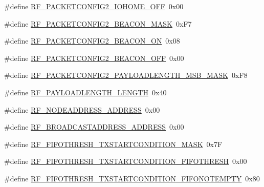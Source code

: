 \begin{DoxyCompactItemize}
\item 
\#define \mbox{\hyperlink{sx1276_regs-_fsk_8h_a4c835d63f6e0105443e2ce5353f9f7fb}{R\+F\+\_\+\+P\+A\+C\+K\+E\+T\+C\+O\+N\+F\+I\+G2\+\_\+\+I\+O\+H\+O\+M\+E\+\_\+\+O\+FF}}~0x00
\item 
\#define \mbox{\hyperlink{sx1276_regs-_fsk_8h_a1c363971f1c7a8065204bc8c6f156333}{R\+F\+\_\+\+P\+A\+C\+K\+E\+T\+C\+O\+N\+F\+I\+G2\+\_\+\+B\+E\+A\+C\+O\+N\+\_\+\+M\+A\+SK}}~0x\+F7
\item 
\#define \mbox{\hyperlink{sx1276_regs-_fsk_8h_a454732572980957a184bc0ad1b0248e4}{R\+F\+\_\+\+P\+A\+C\+K\+E\+T\+C\+O\+N\+F\+I\+G2\+\_\+\+B\+E\+A\+C\+O\+N\+\_\+\+ON}}~0x08
\item 
\#define \mbox{\hyperlink{sx1276_regs-_fsk_8h_a06a6c1e69dfcb07cc709d00d5935e43d}{R\+F\+\_\+\+P\+A\+C\+K\+E\+T\+C\+O\+N\+F\+I\+G2\+\_\+\+B\+E\+A\+C\+O\+N\+\_\+\+O\+FF}}~0x00
\item 
\#define \mbox{\hyperlink{sx1276_regs-_fsk_8h_a2a5f92482f4317a5eadb24f9ffe5443d}{R\+F\+\_\+\+P\+A\+C\+K\+E\+T\+C\+O\+N\+F\+I\+G2\+\_\+\+P\+A\+Y\+L\+O\+A\+D\+L\+E\+N\+G\+T\+H\+\_\+\+M\+S\+B\+\_\+\+M\+A\+SK}}~0x\+F8
\item 
\#define \mbox{\hyperlink{sx1276_regs-_fsk_8h_a5bedd7662c9e637130ec18bbdc710f3c}{R\+F\+\_\+\+P\+A\+Y\+L\+O\+A\+D\+L\+E\+N\+G\+T\+H\+\_\+\+L\+E\+N\+G\+TH}}~0x40
\item 
\#define \mbox{\hyperlink{sx1276_regs-_fsk_8h_acbca54b084bb21f9cd767b00c83dd4a1}{R\+F\+\_\+\+N\+O\+D\+E\+A\+D\+D\+R\+E\+S\+S\+\_\+\+A\+D\+D\+R\+E\+SS}}~0x00
\item 
\#define \mbox{\hyperlink{sx1276_regs-_fsk_8h_a6fe83305d4e9adead59e7783120b0ee5}{R\+F\+\_\+\+B\+R\+O\+A\+D\+C\+A\+S\+T\+A\+D\+D\+R\+E\+S\+S\+\_\+\+A\+D\+D\+R\+E\+SS}}~0x00
\item 
\#define \mbox{\hyperlink{sx1276_regs-_fsk_8h_af0bc1b4471a1dbd9d6e11895fe34d154}{R\+F\+\_\+\+F\+I\+F\+O\+T\+H\+R\+E\+S\+H\+\_\+\+T\+X\+S\+T\+A\+R\+T\+C\+O\+N\+D\+I\+T\+I\+O\+N\+\_\+\+M\+A\+SK}}~0x7F
\item 
\#define \mbox{\hyperlink{sx1276_regs-_fsk_8h_aa6ad7e18fef56fd59458fd8b7e723b14}{R\+F\+\_\+\+F\+I\+F\+O\+T\+H\+R\+E\+S\+H\+\_\+\+T\+X\+S\+T\+A\+R\+T\+C\+O\+N\+D\+I\+T\+I\+O\+N\+\_\+\+F\+I\+F\+O\+T\+H\+R\+E\+SH}}~0x00
\item 
\#define \mbox{\hyperlink{sx1276_regs-_fsk_8h_a25f3a10051bb160b646cbc8f05b99bf8}{R\+F\+\_\+\+F\+I\+F\+O\+T\+H\+R\+E\+S\+H\+\_\+\+T\+X\+S\+T\+A\+R\+T\+C\+O\+N\+D\+I\+T\+I\+O\+N\+\_\+\+F\+I\+F\+O\+N\+O\+T\+E\+M\+P\+TY}}~0x80
\item 

\end{DoxyCompactItemize}
